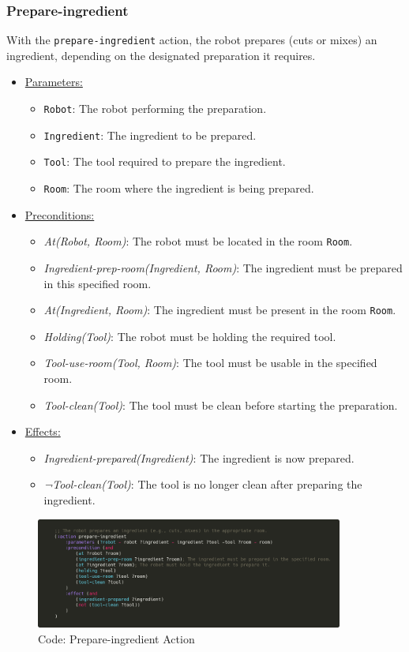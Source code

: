 \documentclass{article}
\begin{document}
\subsubsection{Prepare-ingredient}
With the \texttt{prepare-ingredient} action, the robot prepares (cuts or mixes) an ingredient, depending on the designated preparation it requires.
\begin{itemize}
    \item \underline{Parameters:}
    \begin{itemize}
        \item \texttt{Robot}: The robot performing the preparation.
        \item \texttt{Ingredient}: The ingredient to be prepared.
        \item \texttt{Tool}: The tool required to prepare the ingredient.
        \item \texttt{Room}: The room where the ingredient is being prepared.
    \end{itemize}
    \item \underline{Preconditions:}
    \begin{itemize}
        \item \textit{At(Robot, Room)}: The robot must be located in the room \texttt{Room}.
        \item \textit{Ingredient-prep-room(Ingredient, Room)}: The ingredient must be prepared in this specified room.
        \item \textit{At(Ingredient, Room)}: The ingredient must be present in the room \texttt{Room}.
        \item \textit{Holding(Tool)}: The robot must be holding the required tool.
        \item \textit{Tool-use-room(Tool, Room)}: The tool must be usable in the specified room.
        \item \textit{Tool-clean(Tool)}: The tool must be clean before starting the preparation.
    \end{itemize}
    \item \underline{Effects:}
    \begin{itemize}
        \item \textit{Ingredient-prepared(Ingredient)}: The ingredient is now prepared.
        \item \textit{¬Tool-clean(Tool)}: The tool is no longer clean after preparing the ingredient.
    \end{itemize}
\end{itemize}
    \begin{figure}[H]
    \centering
    \includegraphics[width=0.90\textwidth]{assets/prepare-ingredient.png}
    \caption{Code: Prepare-ingredient Action}
    \label{fig:act:prepare-ing}
\end{figure}
\end{document}
